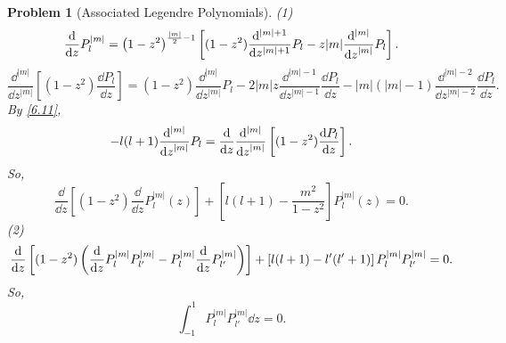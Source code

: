 \documentclass{article}
\theoremstyle{1}
\newtheorem{problem}{Problem}
\begin{document}
\begin{problem}[Associated Legendre Polynomials]
    (1) 
    \begin{equation}
        \dv{z} P^{|m|}_l=\left(1-z^2\right)^{\frac{|m|}{2}-1}\left[(1-z^2)\frac{\dd^{|m|+1}}{\dd{z^{|m|+1}}}P_l-z|m|\frac{\dd^{|m|}}{\dd{z}^{|m|}}P_l\right].
    \end{equation}
    \begin{equation}
        \frac{\dd^{|m|}}{\dd{z}^{|m|}}\left[(1-z^2)\frac{\dd{P_l}}{\dd{z}}\right]=(1-z^2)\frac{\dd^{|m|}}{\dd{z}^{|m|}}P_l-2|m|z\frac{\dd^{|m|-1}}{\dd{z}^{|m|-1}}\frac{\dd{P_l}}{\dd{z}}-|m|(|m|-1)\frac{\dd^{|m|-2}}{\dd{z}^{|m|-2}}\frac{\dd{P_l}}{\dd{z}}.
    \end{equation}
    By \eqref{6.11},
    \begin{equation}
        -l(l+1)\frac{\dd^{|m|}}{\dd{z}^{|m|}}P_l=\dv{z}\frac{\dd^{|m|}}{\dd{z}^{|m|}}\left[(1-z^2)\frac{\dd{P_l}}{\dd{z}}\right].
    \end{equation}
    So,
    \begin{equation}
        \frac{\dd}{\dd z } \left[ (1 - z^2) \frac{\dd}{\dd z} P_l^{|m|}(z) \right] + \left[ l(l + 1) - \frac{m^2}{1 - z^2} \right] P_l^{|m|}(z) = 0.
    \end{equation}
    (2) {\small
    \begin{equation}
        \dv{z}\left[(1-z^2)\left(\dv{z}P_l^{|m|}P_{l'}^{|m|}-P_l^{|m|}\dv{z}P_{l'}^{|m|}\right)\right]+\left[l(l+1)-l'(l'+1)\right]P_l^{|m|}P_{l'}^{|m|}=0.
    \end{equation}}
    So,
    \begin{equation}
        \int_{-1}^{1}P_l^{|m|}P_{l'}^{|m|}\dd{z}=0.
    \end{equation}
\end{problem}
\end{document}
